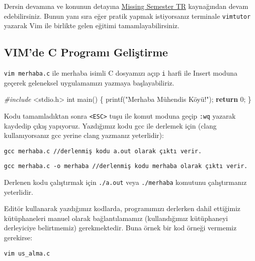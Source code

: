 \documentclass[
]{book}
\newenvironment{Shaded}{\begin{snugshade}}{\end{snugshade}}
\newcommand{\ControlFlowTok}[1]{\textcolor[rgb]{0.13,0.29,0.53}{\textbf{#1}}}
\newcommand{\DataTypeTok}[1]{\textcolor[rgb]{0.13,0.29,0.53}{#1}}
\newcommand{\DecValTok}[1]{\textcolor[rgb]{0.00,0.00,0.81}{#1}}
\newcommand{\ImportTok}[1]{#1}
\newcommand{\NormalTok}[1]{#1}
\newcommand{\PreprocessorTok}[1]{\textcolor[rgb]{0.56,0.35,0.01}{\textit{#1}}}
\newcommand{\StringTok}[1]{\textcolor[rgb]{0.31,0.60,0.02}{#1}}
\begin{document}
Dersin devamına ve konunun detayına \href{https://missing-semester-tr.github.io/}{Missing Semester TR} kaynağından devam edebilirsiniz. Bunun yanı sıra eğer pratik yapmak istiyorsanız terminale \texttt{vimtutor} yazarak Vim ile birlikte gelen eğitimi tamamlayabilirsiniz.

\hypertarget{vimde-c-programux131-geliux15ftirme}{%
\subsection*{VIM'de C Programı Geliştirme}\label{vimde-c-programux131-geliux15ftirme}}

\texttt{vim\ merhaba.c} ile merhaba isimli C dosyamızı açıp \texttt{i} harfi ile Insert moduna geçerek geleneksel uygulamamızı yazmaya başlayabiliriz.

\begin{Shaded}
\begin{Highlighting}[]
\PreprocessorTok{\#include }\ImportTok{<stdio.h>}
\DataTypeTok{int}\NormalTok{ main()}
\NormalTok{\{}
\NormalTok{  printf(}\StringTok{"Merhaba Mühendis Köyü!"}\NormalTok{);}
  \ControlFlowTok{return} \DecValTok{0}\NormalTok{;}
\NormalTok{\}}
\end{Highlighting}
\end{Shaded}

Kodu tamamladıktan sonra \texttt{\textless{}ESC\textgreater{}} tuşu ile komut moduna geçip \texttt{:wq} yazarak kaydedip çıkış yapıyoruz. Yazdığımız kodu gcc ile derlemek için (clang kullanıyorsanız gcc yerine clang yazmanız yeterlidir):

\texttt{gcc\ merhaba.c\ //derlenmiş\ kodu\ a.out\ olarak\ çıktı\ verir.}

\texttt{gcc\ merhaba.c\ -o\ merhaba\ //derlenmiş\ kodu\ merhaba\ olarak\ çıktı\ verir.}

Derlenen kodu çalıştırmak için \texttt{./a.out} veya \texttt{./merhaba} komutunu çalıştırmanız yeterlidir.

Editör kullanarak yazdığımız kodlarda, programımızı derlerken dahil ettiğimiz kütüphaneleri manuel olarak bağlantılamamız (kullandığımız kütüphaneyi derleyiciye belirtmemiz) gerekmektedir. Buna örnek bir kod örneği vermemiz gerekirse:

\texttt{vim\ us\_alma.c}
\end{document}
